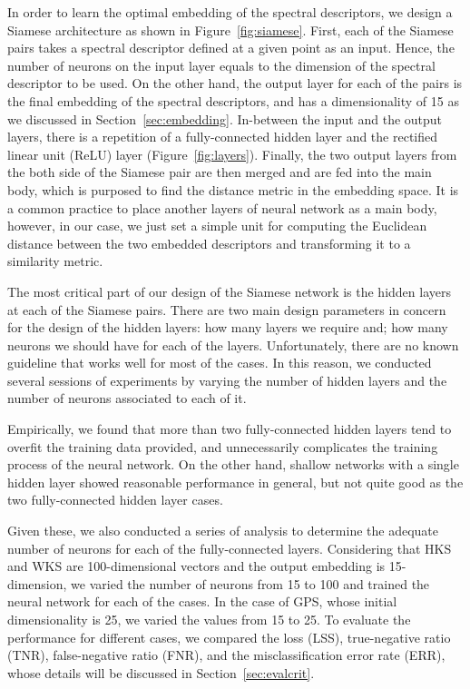 \documentclass[5p,twocolumn,10pt,times]{elsarticle}
\begin{document}
In order to learn the optimal embedding of the spectral descriptors, we design a Siamese architecture as shown in Figure~\ref{fig:siamese}. First, each of the Siamese pairs takes a spectral descriptor defined at a given point as an input. Hence, the number of neurons on the input layer equals to the dimension of the spectral descriptor to be used. On the other hand, the output layer for each of the pairs is the final embedding of the spectral descriptors, and has a dimensionality of 15 as we discussed in Section~\ref{sec:embedding}. In-between the input and the output layers, there is a repetition of a fully-connected hidden layer and the rectified linear unit (ReLU) layer (Figure~\ref{fig:layers}). Finally, the two output layers from the both side of the Siamese pair are then merged and are fed into the main body, which is purposed to find the distance metric in the embedding space. It is a common practice to place another layers of neural network as a main body, however, in our case, we just set a simple unit for computing the Euclidean distance between the two embedded descriptors and transforming it to a similarity metric.

The most critical part of our design of the Siamese network is the hidden layers at each of the Siamese pairs. There are two main design parameters in concern for the design of the hidden layers: how many layers we require and; how many neurons we should have for each of the layers. Unfortunately, there are no known guideline that works well for most of the cases. In this reason, we conducted several sessions of experiments by varying the number of hidden layers and the number of neurons associated to each of it.

Empirically, we found that more than two fully-connected hidden layers tend to overfit the training data provided, and unnecessarily complicates the training process of the neural network. On the other hand, shallow networks with a single hidden layer showed reasonable performance in general, but not quite good as the two fully-connected hidden layer cases.

Given these, we also conducted a series of analysis to determine the adequate number of neurons for each of the fully-connected layers. Considering that HKS and WKS are 100-dimensional vectors and the output embedding is 15-dimension, we varied the number of neurons from 15 to 100 and trained the neural network for each of the cases. In the case of GPS, whose initial dimensionality is 25, we varied the values from 15 to 25. To evaluate the performance for different cases, we compared the loss (LSS), true-negative ratio (TNR), false-negative ratio (FNR), and the misclassification error rate (ERR), whose details will be discussed in Section~\ref{sec:evalcrit}.
\end{document}
